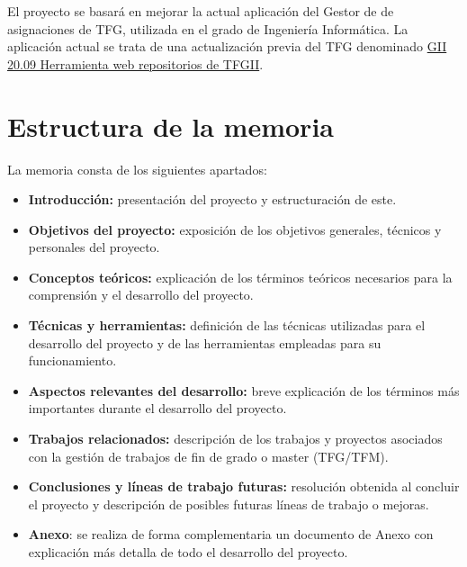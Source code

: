 
El proyecto se basará en mejorar la actual aplicación del Gestor de de asignaciones de TFG, utilizada en el grado de Ingeniería Informática. La aplicación actual se trata de una actualización previa del TFG denominado \href{https://github.com/dbo1001/Gestor-TFG-2021}{GII 20.09 Herramienta web
repositorios de TFGII}. 



\section{Estructura de la memoria}
La memoria consta de los siguientes apartados:

\begin{itemize}
	\item \textbf{Introducción:} presentación del proyecto y estructuración de este.
	\item \textbf{Objetivos del proyecto:}  exposición de los  objetivos generales, técnicos y personales del proyecto.
	\item \textbf{Conceptos teóricos:} explicación de los términos teóricos necesarios para la comprensión y el desarrollo del proyecto.
	\item \textbf{Técnicas y herramientas:} definición de las técnicas utilizadas para el desarrollo del proyecto y de las herramientas empleadas para su funcionamiento.
	\item \textbf{Aspectos relevantes del desarrollo:} breve explicación de los términos más importantes durante el desarrollo del proyecto.
	\item \textbf{Trabajos relacionados:} descripción de los trabajos y proyectos asociados con la gestión de trabajos de fin de grado o master (TFG/TFM).
	\item \textbf{Conclusiones y líneas de trabajo futuras:} resolución obtenida al concluir el proyecto y descripción de posibles futuras líneas de trabajo o mejoras.
	\item \textbf{Anexo}: se realiza de forma complementaria un documento de Anexo con explicación más detalla de todo el desarrollo del proyecto.
\end{itemize}